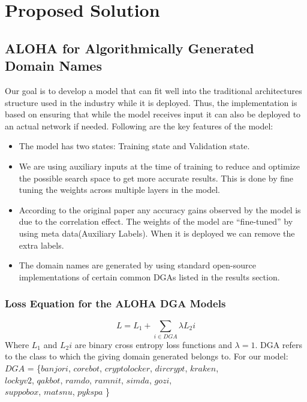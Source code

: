 \documentclass[conference]{IEEEtran}
\begin{document}
\section{Proposed Solution}

\subsection{ALOHA for Algorithmically Generated Domain Names}
Our goal is to develop a model that can fit well into the traditional architectures structure used in the industry while it is deployed. Thus, the implementation is based on ensuring that while the model receives input it can also be deployed to an actual network if needed.
Following are the key features of the model:
\begin{itemize}
\item The model has two states: Training state and Validation state. 
\item We are using auxiliary inputs at the time of training to reduce and optimize the possible search space to get more accurate results. This is done by fine tuning the weights across multiple layers in the model.
\item According to the original paper any accuracy gains observed by the model is due to the correlation effect. The weights of the model are “fine-tuned” by using meta data(Auxiliary Labels). When it is deployed we can remove the extra labels.
\item The domain names are generated by using standard open-source implementations of certain common DGAs listed in the results section.
\end{itemize}
\cite{b3}
\subsubsection{Loss Equation for the ALOHA DGA Models}
\begin{equation}
  \label{eq:malicious_tag_loss}
  L = L_1+\sum_{{i\in DGA}}\lambda L_2i
\end{equation}
Where $L_1$ and $L_2i$ are binary cross entropy loss functions and $\lambda = 1$. DGA refers to the class to which the giving domain generated belongs to. For our model:\\
  $DGA$ = \{$banjori$, $corebot$, $cryptolocker$, $dircrypt$, $kraken$,\\ $lockyv2$, $qakbot$, $ramdo$, $ramnit$, $simda$, $gozi$,\\ $suppobox$, $matsnu$, $pykspa$ \}
\end{document}
